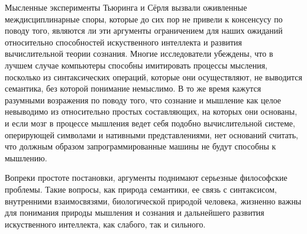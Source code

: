 \documentclass[12pt, specialist, subf, substylefile = spbu.rtx]{disser}
\begin{document}
\conclusion
Мысленные эксперименты Тьюринга и Сёрля вызвали оживленные междисциплинарные споры, которые до сих пор не привели к консенсусу по поводу того, являются ли эти аргументы ограничением для наших ожиданий относительно способностей искуственного интеллекта и развития вычислительной теории сознания. Многие исследователи убеждены, что в лучшем случае компьютеры способны имитировать процессы мысления, посколько из синтаксических операций, которые они осуществляют, не выводится семантика, без которой понимание немыслимо. В то же время кажутся разумными возражения по поводу того, что сознание и мышление как целое невыводимо из относительно простых составляющих, на которых они основаны, и если мозг в процессе мышления ведет себя подобно вычислительной системе, оперирующей символами и нативными представлениями, нет оснований считать, что должным образом запрограммированные машины не будут способны к мышлению.

Вопреки простоте постановки, аргументы поднимают серьезные философские проблемы. Такие вопросы, как природа семантики, ее связь с синтаксисом, внутренними взаимосвязями, биологической природой человека, жизненно важны для понимания природы мышления и сознания и дальнейшего развития искуственного интеллекта, как слабого, так и сильного.



\end{document}
